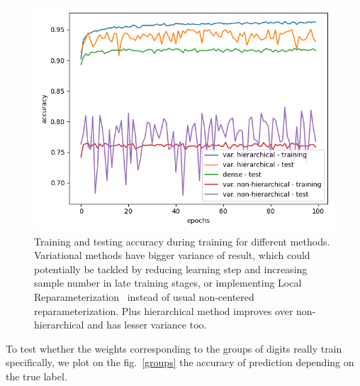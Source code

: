 \documentclass{article}
\newcommand{\wid}{15cm}
\begin{document}
\begin{figure}
	\centering
		\includegraphics[width=\wid]{accuracy.png}
	\caption{Training and testing accuracy during training for different methods. Variational methods have bigger variance of result, which could potentially be tackled by reducing learning step and increasing sample number in late training stages, or implementing Local Reparameterization~\cite{localReparam} instead of usual non-centered reparameterization. Plus hierarchical method improves over non-hierarchical and has lesser variance too.}
	\label{acc}
\end{figure}	

To test whether the weights corresponding to the groups of digits really train specifically, we plot on the fig.~\ref{groups} the accuracy of prediction depending on the true label.
\end{document}
